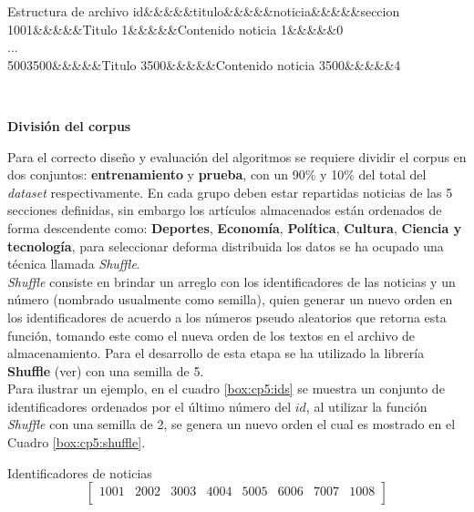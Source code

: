 \begin{mygraybox}[label={box:cp5:archivo}]{Estructura de archivo} 
id\&\&\&\&\&titulo\&\&\&\&\&noticia\&\&\&\&\&seccion\\
1001\&\&\&\&\&Titulo 1\&\&\&\&\&Contenido noticia 1\&\&\&\&\&0\\
...\\
5003500\&\&\&\&\&Titulo 3500\&\&\&\&\&Contenido noticia 3500\&\&\&\&\&4
\end{mygraybox}

\ \\


\begin{large}
\textbf{División del corpus}\\
\end{large}


Para el correcto diseño y evaluación del algoritmos se requiere dividir el corpus en dos conjuntos: \textbf{entrenamiento} y \textbf{prueba}, con un 90\% y 10\% del total del \textit{dataset} respectivamente. En cada grupo deben estar repartidas noticias de las 5 secciones definidas, sin embargo los artículos almacenados están ordenados de forma descendente como: \textbf{Deportes}, \textbf{Economía}, \textbf{Política}, \textbf{Cultura}, \textbf{Ciencia y tecnología}, para seleccionar deforma distribuida los datos se ha ocupado una técnica llamada \textit{Shuffle}.\\

\textit{Shuffle} consiste en brindar un arreglo con los identificadores de las noticias y un número (nombrado usualmente como semilla), quien generar un nuevo orden en los identificadores de acuerdo a los números pseudo aleatorios que retorna esta función, tomando este como el nueva orden de los textos en el archivo de almacenamiento. Para el desarrollo de esta etapa se ha utilizado la librería \textbf{Shuffle} (ver) con una semilla de 5.\\

Para ilustrar un ejemplo, en el cuadro \ref{box:cp5:ids} se muestra un conjunto de identificadores ordenados por el último número del $id$, al utilizar la función \textit{Shuffle} con una semilla de 2, se genera un nuevo orden el cual es mostrado en el Cuadro \ref{box:cp5:shuffle}.\\


\begin{mygraybox}[label={box:cp5:ids}]{Identificadores de noticias} 
\begin{equation*}
\begin{bmatrix}
1001 & 2002 & 3003 & 4004 & 5005 & 6006 & 7007 & 1008\\ 
\end{bmatrix}
\end{equation*}
\end{mygraybox}

